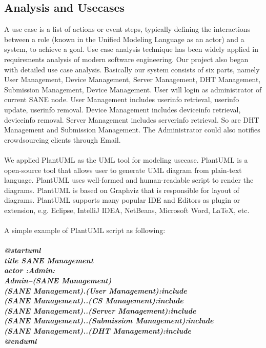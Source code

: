 \documentclass[12pt,oneside,a4paper]{article}
\begin{document}
\subsection{\large Analysis and Usecases}
A use case is a list of actions or event steps, typically defining the interactions between a role (known in the Unified Modeling Language as an actor) and a system, to achieve a goal. Use case analysis technique has been widely applied in requirements analysis of modern software engineering. Our project also began with detailed use case analysis. Basically our system consists of six parts, namely User Management, Device Management, Server Management, DHT Management, Submission Management, Device Management. User will login as administrator of current SANE node. User Management includes userinfo retrieval, userinfo update, userinfo removal. Device Management includes deviceinfo retrieval, deviceinfo removal. Server Management includes serverinfo retrieval. So are DHT Management and Submission Management. The Administrator could also notifies crowdsourcing clients through Email.\\\\
We applied PlantUML as the UML tool for modeling usecase. PlantUML is a open-source tool that allows user to generate UML diagram from plain-text language. PlantUML uses well-formed and human-readable script to render the diagrams. PlantUML is based on Graphviz that is responsible for layout of diagrams. PlantUML supports many popular IDE and Editors as plugin or extension, e.g. Eclipse, IntelliJ IDEA, NetBeans, Microsoft Word, LaTeX, etc.\\\\
A simple example of PlantUML script as following:\\\\
\scriptsize{\textbf{\emph{
@startuml\\
title  SANE Management\\
actor :Admin:\\
Admin--(SANE Management)\\
(SANE Management).(User Management):include\\
(SANE Management)..(CS Management):include\\
(SANE Management)..(Server Management):include\\
(SANE Management)..(Submission Management):include\\
(SANE Management)..(DHT Management):include\\
@enduml}}}\\\\
\end{document}
